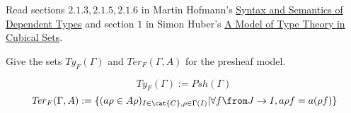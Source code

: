 \def\pathToRoot{../../}
\usepackage{semantic}



\author{Nikita Ziuzin}

\begin{hint}
  Read sections $2.1.3, 2.1.5, 2.1.6$ in Martin Hofmann's \href{http://www.irif.fr/~mellies/mpri/mpri-ens/articles/hofmann-syntax-and-semantics-of-dependent-types.pdf}{Syntax and Semantics of Dependent Types} and section $1$ in Simon Huber's \href{http://www.cse.chalmers.se/~simonhu/misc/lic.pdf}{A Model of Type Theory in Cubical Sets}.
\end{hint}

\begin{exercise}
  Give the sets $\mathit{Ty}_F(\Gamma)$ and $\mathit{Ter}_F(\Gamma, A)$ for
  the presheaf model.
\end{exercise}
\begin{answer}
  \[
    \mathit{Ty}_F(\Gamma) := \mathit{Psh(\Gamma)}
  \]
  \[
    \mathit{Ter}_F(\Gamma, A) := \{(a\rho \in A\rho)_{I \in \cat{C}, \rho \in \Gamma(I)} | \forall f \from J \to I, a\rho f = a(\rho f) \}
  \]
\end{answer}

